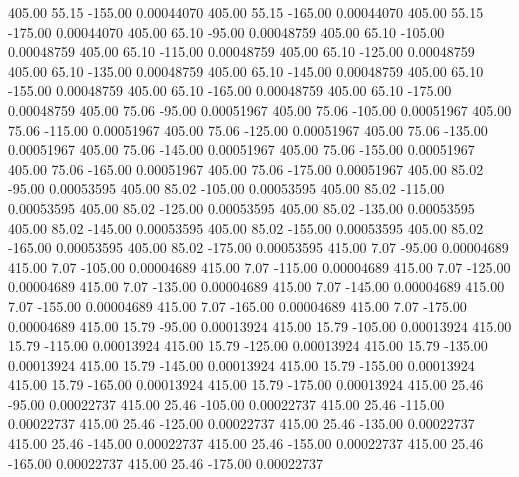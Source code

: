     405.00     55.15   -155.00     0.00044070
    405.00     55.15   -165.00     0.00044070
    405.00     55.15   -175.00     0.00044070
    405.00     65.10    -95.00     0.00048759
    405.00     65.10   -105.00     0.00048759
    405.00     65.10   -115.00     0.00048759
    405.00     65.10   -125.00     0.00048759
    405.00     65.10   -135.00     0.00048759
    405.00     65.10   -145.00     0.00048759
    405.00     65.10   -155.00     0.00048759
    405.00     65.10   -165.00     0.00048759
    405.00     65.10   -175.00     0.00048759
    405.00     75.06    -95.00     0.00051967
    405.00     75.06   -105.00     0.00051967
    405.00     75.06   -115.00     0.00051967
    405.00     75.06   -125.00     0.00051967
    405.00     75.06   -135.00     0.00051967
    405.00     75.06   -145.00     0.00051967
    405.00     75.06   -155.00     0.00051967
    405.00     75.06   -165.00     0.00051967
    405.00     75.06   -175.00     0.00051967
    405.00     85.02    -95.00     0.00053595
    405.00     85.02   -105.00     0.00053595
    405.00     85.02   -115.00     0.00053595
    405.00     85.02   -125.00     0.00053595
    405.00     85.02   -135.00     0.00053595
    405.00     85.02   -145.00     0.00053595
    405.00     85.02   -155.00     0.00053595
    405.00     85.02   -165.00     0.00053595
    405.00     85.02   -175.00     0.00053595
    415.00      7.07    -95.00     0.00004689
    415.00      7.07   -105.00     0.00004689
    415.00      7.07   -115.00     0.00004689
    415.00      7.07   -125.00     0.00004689
    415.00      7.07   -135.00     0.00004689
    415.00      7.07   -145.00     0.00004689
    415.00      7.07   -155.00     0.00004689
    415.00      7.07   -165.00     0.00004689
    415.00      7.07   -175.00     0.00004689
    415.00     15.79    -95.00     0.00013924
    415.00     15.79   -105.00     0.00013924
    415.00     15.79   -115.00     0.00013924
    415.00     15.79   -125.00     0.00013924
    415.00     15.79   -135.00     0.00013924
    415.00     15.79   -145.00     0.00013924
    415.00     15.79   -155.00     0.00013924
    415.00     15.79   -165.00     0.00013924
    415.00     15.79   -175.00     0.00013924
    415.00     25.46    -95.00     0.00022737
    415.00     25.46   -105.00     0.00022737
    415.00     25.46   -115.00     0.00022737
    415.00     25.46   -125.00     0.00022737
    415.00     25.46   -135.00     0.00022737
    415.00     25.46   -145.00     0.00022737
    415.00     25.46   -155.00     0.00022737
    415.00     25.46   -165.00     0.00022737
    415.00     25.46   -175.00     0.00022737
